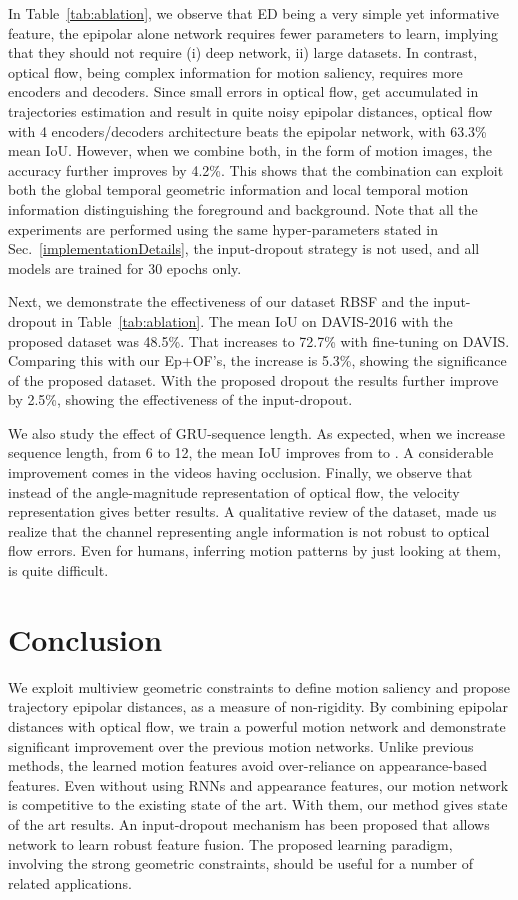 \documentclass[10pt,twocolumn,letterpaper]{article}
\begin{document}
In Table~\ref{tab:ablation}, we observe that ED being a very simple yet informative feature, the epipolar alone network requires fewer parameters to learn, implying that they should not require (i) deep network, ii) large datasets. In contrast, optical flow, being complex information for motion saliency, requires more encoders and decoders. Since small errors in optical flow, get accumulated in trajectories estimation and result in quite noisy epipolar distances, optical flow with 4 encoders/decoders architecture beats the epipolar network, with 63.3\% mean IoU. However, when we combine both, in the form of motion images, the accuracy further improves by 4.2\%. This shows that the combination can exploit both the global temporal geometric information and local temporal motion information distinguishing the foreground and background. Note that all the experiments are performed using the same hyper-parameters stated in Sec.~\ref{implementationDetails}, the input-dropout strategy is not used, and all models are trained for 30 epochs only.

Next, we demonstrate the effectiveness of our dataset RBSF and the input-dropout in Table~\ref{tab:ablation}. The mean IoU on DAVIS-2016 with the proposed dataset was 48.5\%. That increases to 72.7\% with fine-tuning on DAVIS. Comparing this with our Ep+OF's, the increase is 5.3\%, showing the significance of the proposed dataset. With the proposed dropout the results further improve by 2.5\%, showing the effectiveness of the input-dropout. 

We also study the effect of GRU-sequence length. As expected, when we increase sequence length, from 6 to 12, the mean IoU improves from  to . A considerable improvement comes in the videos having occlusion. Finally, we observe that instead of the angle-magnitude representation of optical flow, the velocity representation gives better results. A qualitative review of the dataset, made us realize that the channel representing angle information is not robust to optical flow errors. Even for humans, inferring motion patterns by just looking at them, is quite difficult. 
\section{Conclusion}
We exploit multiview geometric constraints to define motion saliency and propose trajectory epipolar distances, as a measure of non-rigidity. By combining epipolar distances with optical flow, we train a powerful motion network and demonstrate significant improvement over the previous motion networks. Unlike previous methods, the learned motion features avoid over-reliance on appearance-based features. Even without using RNNs and appearance features, our motion network is competitive to the existing state of the art. With them, our method gives state of the art results.
An input-dropout mechanism has been proposed that allows network to learn robust feature fusion. 
The proposed learning paradigm, involving the strong geometric constraints, should be useful for a number of related applications.  


{\small


}
\end{document}
